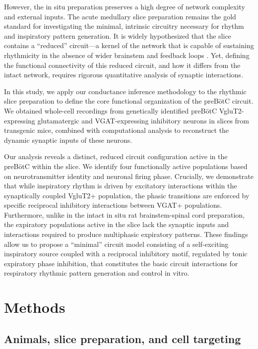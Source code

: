 \documentclass[
]{article}
\begin{document}
However, the in situ preparation preserves a high degree of network complexity and external inputs. The acute medullary slice preparation remains the gold standard for investigating the minimal, intrinsic circuitry necessary for rhythm and inspiratory pattern generation. It is widely hypothesized that the slice contains a ``reduced'' circuit---a kernel of the network that is capable of sustaining rhythmicity in the absence of wider brainstem and feedback loops \citep[e.g.,][]{smith2000respiratory,feldman2006looking,smith2007spatial,smith2013brainstem,delnegro2018defining}. Yet, defining the functional connectivity of this reduced circuit, and how it differs from the intact network, requires rigorous quantitative analysis of synaptic interactions.

In this study, we apply our conductance inference methodology to the rhythmic slice preparation to define the core functional organization of the preBötC circuit. We obtained whole-cell recordings from genetically identified preBötC VgluT2-expressing glutamatergic and VGAT-expressing inhibitory neurons in slices from transgenic mice, combined with computational analysis to reconstruct the dynamic synaptic inputs of these neurons.

Our analysis reveals a distinct, reduced circuit configuration active in the preBötC within the slice. We identify four functionally active populations based on neurotransmitter identity and neuronal firing phase. Crucially, we demonstrate that while inspiratory rhythm is driven by excitatory interactions within the synaptically coupled VgluT2+ population, the phasic transitions are enforced by specific reciprocal inhibitory interactions between VGAT+ populations. Furthermore, unlike in the intact in situ rat brainstem-spinal cord preparation, the expiratory populations active in the slice lack the synaptic inputs and interactions required to produce multiphasic expiratory patterns. These findings allow us to propose a ``minimal'' circuit model consisting of a self-exciting inspiratory source coupled with a reciprocal inhibitory motif, regulated by tonic expiratory phase inhibition, that constitutes the basic circuit interactions for respiratory rhythmic pattern generation and control in vitro.

\section{Methods}

\subsection{Animals, slice preparation, and cell targeting}\label{animals-slice-preparation-and-cell-targeting}
\end{document}
